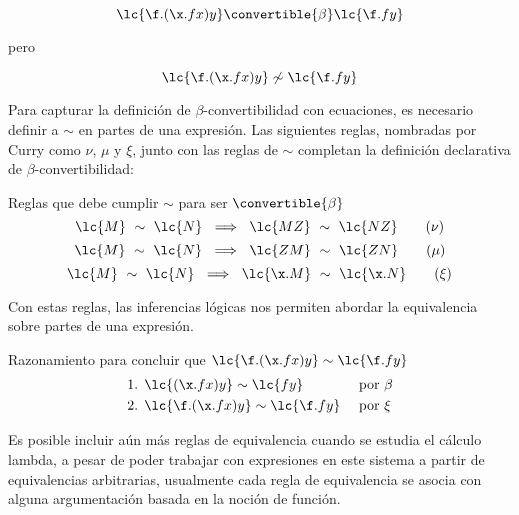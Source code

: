 \[\lc{\f.(\x.f x)y} \convertible{\beta} \lc{\f.f y}\]

pero

\[\lc{\f.(\x.f x)y} \not\sim \lc{\f.f y}\]

Para capturar la definición de \(\beta\)-convertibilidad con ecuaciones, es
necesario definir a \(\sim\) en partes de una expresión. Las siguientes reglas,
nombradas por Curry \cite[p.~59]{Curry:CombinatoryLogicI} como \(\nu\), \(\mu\) y
\(\xi\), junto con las reglas de \(\sim\) completan la definición declarativa de
\(\beta\)-convertibilidad:

\begin{defi} Reglas que debe cumplir \(\sim\) para ser \(\convertible{\beta}\)
  \label{definicion:2}
  \begin{equation} \label{definicion:2:nu}
    \lc{M}\ \sim\ \lc{N}\ \implies\ \lc{M Z}\ \sim\ \lc{N Z} \tag{\ensuremath{\nu}}
  \end{equation}
  \begin{equation} \label{definicion:2:mu}
    \lc{M}\ \sim\ \lc{N}\ \implies\ \lc{Z M}\ \sim\ \lc{Z N} \tag{\ensuremath{\mu}}
  \end{equation}
  \begin{equation} \label{definicion:3:xi}
    \lc{M}\ \sim\ \lc{N}\ \implies\ \lc{\x.M}\ \sim\ \lc{\x.N} \tag{\ensuremath{\xi}}
  \end{equation}
\end{defi}

Con estas reglas, las inferencias lógicas nos permiten abordar la equivalencia
sobre partes de una expresión. \\

\begin{ejemplo} Razonamiento para concluir que \(\lc{\f.(\x.f x)y} \sim \lc{\f.f y}\)
  \begin{align*}
    \text{1. } &\lc{(\x.f x)y} \sim \lc{f y} & &\text{ por \(\beta\)} \\
    \text{2. } &\lc{\f.(\x.f x)y} \sim \lc{\f.f y} & &\text{ por \(\xi\)}
  \end{align*}
\end{ejemplo}

Es posible incluir aún más reglas de equivalencia cuando se estudia el cálculo
lambda, a pesar de poder trabajar con expresiones en este sistema a partir de
equivalencias arbitrarias, usualmente cada regla de equivalencia se asocia
con alguna argumentación basada en la noción de función. \\

